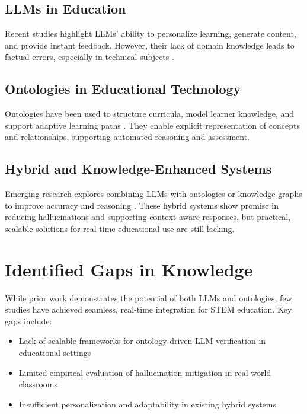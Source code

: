 \subsection{LLMs in Education}
Recent studies highlight LLMs' ability to personalize learning, generate content, and provide instant feedback. However, their lack of domain knowledge leads to factual errors, especially in technical subjects \cite{huang2024survey, su2024confabulation}.

\subsection{Ontologies in Educational Technology}
Ontologies have been used to structure curricula, model learner knowledge, and support adaptive learning paths \cite{liu2024ontology, wiley2024stem}. They enable explicit representation of concepts and relationships, supporting automated reasoning and assessment.

\subsection{Hybrid and Knowledge-Enhanced Systems}
Emerging research explores combining LLMs with ontologies or knowledge graphs to improve accuracy and reasoning \cite{hartl2024knowledge, funk2023neuro, arxiv2024ontology}. These hybrid systems show promise in reducing hallucinations and supporting context-aware responses, but practical, scalable solutions for real-time educational use are still lacking.


\section{Identified Gaps in Knowledge}

While prior work demonstrates the potential of both LLMs and ontologies, few studies have achieved seamless, real-time integration for STEM education. Key gaps include:
\begin{itemize}
    \item Lack of scalable frameworks for ontology-driven LLM verification in educational settings
    \item Limited empirical evaluation of hallucination mitigation in real-world classrooms
    \item Insufficient personalization and adaptability in existing hybrid systems
\end{itemize}

